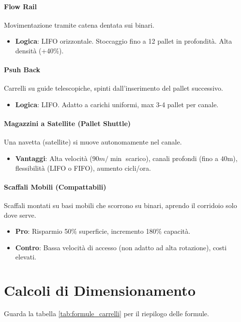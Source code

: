 \paragraph{Flow Rail} Movimentazione tramite catena dentata sui binari.
\begin{itemize}
    \item \textbf{Logica}: LIFO orizzontale. Stoccaggio fino a 12 pallet in profondità. Alta densità (+40\%).
\end{itemize}

%
\paragraph{Psuh Back} Carrelli su guide telescopiche, spinti dall'inserimento del pallet successivo.
\begin{itemize}
    \item \textbf{Logica}: LIFO. Adatto a carichi uniformi, max 3-4 pallet per canale.
\end{itemize}

%
\paragraph{Magazzini a Satellite (Pallet Shuttle)} Una navetta (satellite) si muove autonomamente nel canale.
\begin{itemize}
    \item \textbf{Vantaggi}: Alta velocità ($ 90 \si{m\per\min} $ scarico), canali profondi (fino a $ 40 \si{\m} $), flessibilità (LIFO o FIFO), aumento cicli/ora.
\end{itemize}

%
\paragraph{Scaffali Mobili (Compattabili)} Scaffali montati su basi mobili che scorrono su binari, aprendo il corridoio solo dove serve.
\begin{itemize}
    \item \textbf{Pro}: Risparmio 50\% superficie, incremento 180\% capacità.
    \item \textbf{Contro}: Bassa velocità di accesso (non adatto ad alta rotazione), costi elevati.
\end{itemize}

%
\section{Calcoli di Dimensionamento}
Guarda la tabella \ref{tab:formule_carrelli} per il riepilogo delle formule.
%
